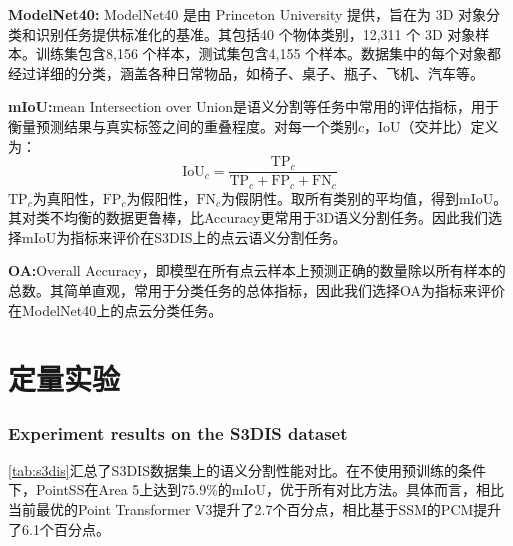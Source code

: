 \documentclass[12pt,a4paper,openany,oneside]{ctexbook}
\theoremstyle{definition}
\theoremstyle{remark}
\begin{document}
\textbf{ModelNet40:}
ModelNet40 是由 Princeton University 提供，旨在为 3D 对象分类和识别任务提供标准化的基准。其包括40 个物体类别，12,311 个 3D 对象样本。训练集包含8,156 个样本，测试集包含4,155 个样本。数据集中的每个对象都经过详细的分类，涵盖各种日常物品，如椅子、桌子、瓶子、飞机、汽车等。


\textbf{mIoU:}mean Intersection over Union是语义分割等任务中常用的评估指标，用于衡量预测结果与真实标签之间的重叠程度。对每一个类别$c$，IoU（交并比）定义为：\begin{equation}\mathrm{IoU}_c=\frac{\mathrm{TP}_c}{\mathrm{TP}_c+\mathrm{FP}_c+\mathrm{FN}_c}\end{equation}
$\mathrm{TP}_{c}$为真阳性，$\mathrm{FP}_{c}$为假阳性，$\mathrm{FN}_{c}$为假阴性。取所有类别的平均值，得到mIoU。其对类不均衡的数据更鲁棒，比Accuracy更常用于3D语义分割任务。因此我们选择mIoU为指标来评价在S3DIS上的点云语义分割任务。

\textbf{OA:}Overall Accuracy，即模型在所有点云样本上预测正确的数量除以所有样本的总数。其简单直观，常用于分类任务的总体指标，因此我们选择OA为指标来评价在ModelNet40上的点云分类任务。

\section{定量实验}

\subsubsection{Experiment results on the S3DIS dataset}
\cref{tab:s3dis}汇总了S3DIS数据集上的语义分割性能对比。在不使用预训练的条件下，PointSS在Area 5上达到75.9\%的mIoU，优于所有对比方法。具体而言，相比当前最优的Point Transformer V3提升了2.7个百分点，相比基于SSM的PCM提升了6.1个百分点。
\end{document}
